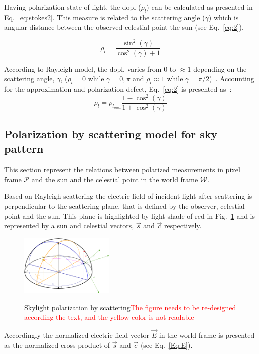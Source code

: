 Having polarization state of light, the \gls{dopl} ($\rho_{l}$) can be
calculated as presented in Eq.~\ref{eq:stokes2}. This measure is related to the
scattering angle ($\gamma$) which is angular distance between the observed
celestial point the sun (see Eq.~\ref{eq:2}).

\begin{equation}
  \label{eq:2}
  \rho_{l} = \frac{\sin^{2}(\gamma)}{\cos^{
      2}(\gamma)+1}
\end{equation}

According to Rayleigh model, the \gls{dopl}, varies
from 0 to $\approx 1$ depending on the scattering angle, $\gamma$, ($\rho_{l} =
0$ while $\gamma = 0, \pi$ and $\rho_{l} \approx 1$ while $\gamma =
\pi/2$)~\cite{smith2007polarization, miyazaki09sunlightpolarization}.
Accounting for the approximation and polarization defect, Eq.~\ref{eq:2}
is presented as~\cite{pomozi2001clearsky}:
\begin{equation}
  \label{eq:3}
  \rho_{l} = \rho_{l_{max}}\frac{1 - \cos^{2}(\gamma)}{1 + \cos^{
      2}(\gamma)}
\end{equation}


\subsection{Polarization by scattering model for sky pattern}
\label{subsec:pscattering}
This section represent the relations between polarized measurements in pixel
frame $\mathcal{P}$ and the sun and the celestial point in the world frame
$\mathcal{W}$.

Based on Rayleigh scattering the electric field of incident light after
scattering is perpendicular to the scattering plane, that is defined by the
observer, celestial point and the sun.  This plane is highlighted by light
shade of red in Fig.~\ref{fig:scattering} and is represented by a sun and
celestial vectors, $\vec{s}$ and $\vec{c}$ respectively.

\begin{figure}
  \centering
  \includegraphics[width=0.4\textwidth]{./content/intro/figures/polasky4-crop.pdf}
  \label{fig:scattering}
  \caption{Skylight polarization by scattering\textcolor{red}{The figure needs
      to be re-designed according the text, and the yellow color is not readable}}
\end{figure}
Accordingly the normalized electric field vector $\vec{E}$ in the world frame
is presented as the normalized cross product of $\vec{s}$ and
$\vec{c}$ (see Eq.~\ref{Eq:E}).

